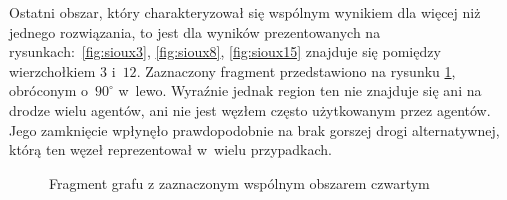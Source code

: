 \documentclass[twoside,12pt]{report}
\begin{document}
Ostatni obszar, który charakteryzował się wspólnym wynikiem dla więcej niż jednego rozwiązania, to jest dla wyników prezentowanych na rysunkach:~\ref{fig:sioux3}, \ref{fig:sioux8}, \ref{fig:sioux15} znajduje się pomiędzy wierzchołkiem $3$ i~$12$. Zaznaczony fragment przedstawiono na rysunku \ref{fig:frag_4}, obróconym o~$90^{\circ}$ w~lewo. Wyraźnie jednak region ten nie znajduje się ani na drodze wielu agentów, ani nie jest węzłem często użytkowanym przez agentów. Jego zamknięcie wpłynęło prawdopodobnie na brak gorszej drogi alternatywnej, którą ten węzeł reprezentował w~wielu przypadkach.

\begin{figure}[htbp]
\centering
{}
\caption{Fragment grafu z zaznaczonym wspólnym obszarem czwartym}
\label{fig:frag_4}
\end{figure}
\end{document}

